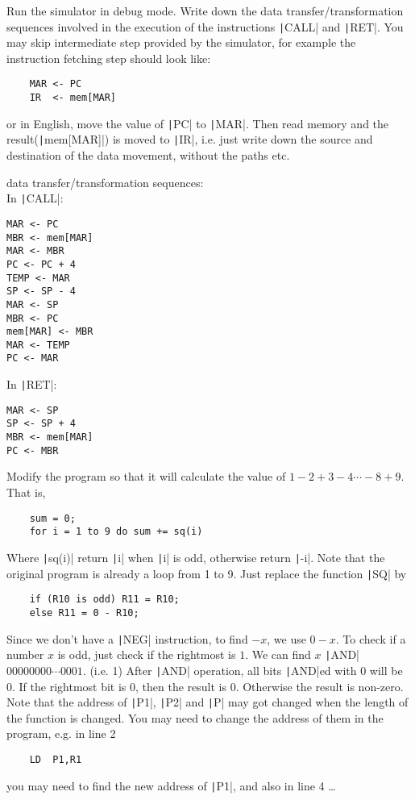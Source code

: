 \documentclass[answers]{exam}
\begin{document}
\begin{questions}
    \question Run the simulator in debug mode. Write down the data transfer/transformation sequences involved in the execution of the instructions \texttt|CALL| and \texttt|RET|.
    You may skip intermediate step provided by the simulator, for example the instruction fetching step should look like:
    \begin{verbatim}
    MAR <- PC
    IR  <- mem[MAR]
    \end{verbatim}
    or in English, move the value of \texttt|PC| to \texttt|MAR|. Then read memory and the result(\texttt|mem[MAR]|) is moved to \texttt|IR|, i.e. just write down the source and destination of the data movement, without the paths etc.

    \begin{solution}
        data transfer/transformation sequences: \\
        In \texttt|CALL|:
        \begin{verbatim}
MAR <- PC
MBR <- mem[MAR]
MAR <- MBR
PC <- PC + 4
TEMP <- MAR
SP <- SP - 4
MAR <- SP
MBR <- PC
mem[MAR] <- MBR
MAR <- TEMP
PC <- MAR        
        \end{verbatim}
        In \texttt|RET|:
        \begin{verbatim}
MAR <- SP
SP <- SP + 4
MBR <- mem[MAR]
PC <- MBR    
        \end{verbatim}
    \end{solution}

    \pagebreak
    \question Modify the program so that it will calculate the value of $1 - 2 + 3 - 4 \cdots - 8 + 9$.
    That is,
    \begin{verbatim}
    sum = 0;
    for i = 1 to 9 do sum += sq(i)
    \end{verbatim}
    Where \texttt|sq(i)| return \texttt|i| when \texttt|i| is odd, otherwise return \texttt|-i|.
    Note that the original program is already a loop from 1 to 9. Just replace the function \texttt|SQ| by
    \begin{verbatim}
    if (R10 is odd) R11 = R10;
    else R11 = 0 - R10;
    \end{verbatim}
    Since we don't have a \texttt|NEG| instruction, to find $-x$, we use $0 - x$.
    To check if a number $x$ is odd, just check if the rightmost is $1$. We can find $x$ \texttt|AND| $00000000 \cdots 0001$. (i.e. 1) After \texttt|AND| operation, all bits \texttt|AND|ed with 0 will be 0. If the rightmost bit is 0, then the result is 0. Otherwise the result is non-zero.
    Note that the address of \texttt|P1|, \texttt|P2| and \texttt|P| may got changed when the length of the function is changed. You may need to change the address of them in the program, e.g. in line 2
    \begin{verbatim}
    LD  P1,R1
    \end{verbatim}
    you may need to find the new address of \texttt|P1|, and also in line 4 \dots


\end{questions}
\end{document}
